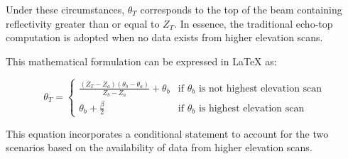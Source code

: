 Under these circumstances, $\theta_{T}$ corresponds to the top of the beam
containing reflectivity greater than or equal to $Z_T$. In essence, the
traditional echo-top computation is adopted when no data exists from higher
elevation scans.

This mathematical formulation can be expressed in LaTeX as:

$$\theta_T = \begin{cases} \frac{(Z_T - Z_a) (\theta_b - \theta_a)}{Z_b - Z_a} +
\theta_b & \text{if } \theta_b \text{ is not highest elevation scan} \\
\theta_b + \frac{\beta}{2} & \text{if } \theta_b \text{ is highest elevation
scan} \end{cases}$$

This equation incorporates a conditional statement to account for the two
scenarios based on the availability of data from higher elevation scans.
